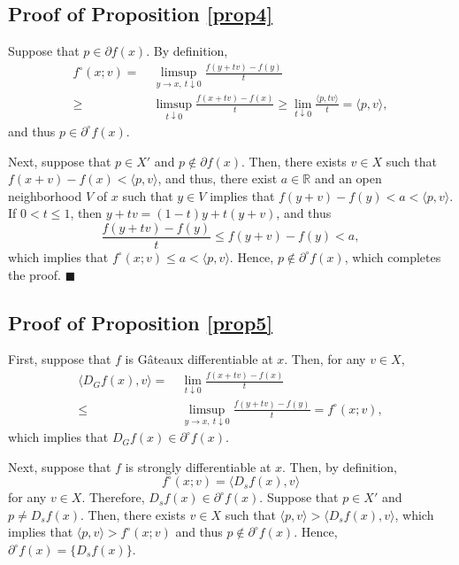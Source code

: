 \documentclass[a4paper,12pt]{article}
\theoremstyle{definition}
\begin{document}
\subsection{Proof of Proposition \ref{prop4}}
Suppose that $p\in \partial f(x)$. By definition,
\begin{align*}
f^{\circ}(x;v)=&~\limsup_{y\to x,\ t\downarrow 0}\frac{f(y+tv)-f(y)}{t}\\
\ge&~\limsup_{t\downarrow 0}\frac{f(x+tv)-f(x)}{t}\ge \lim_{t\downarrow 0}\frac{\langle p,tv\rangle}{t}=\langle p,v\rangle,
\end{align*}
and thus $p\in \partial^{\circ}f(x)$.

Next, suppose that $p\in X'$ and $p\notin \partial f(x)$. Then, there exists $v\in X$ such that $f(x+v)-f(x)<\langle p,v\rangle$, and thus, there exist $a\in \mathbb{R}$ and an open neighborhood $V$ of $x$ such that $y\in V$ implies that $f(y+v)-f(y)<a<\langle p,v\rangle$. If $0<t\le 1$, then $y+tv=(1-t)y+t(y+v)$, and thus
\[\frac{f(y+tv)-f(y)}{t}\le f(y+v)-f(y)<a,\]
which implies that $f^{\circ}(x;v)\le a<\langle p,v\rangle$. Hence, $p\notin \partial^{\circ}f(x)$, which completes the proof. $\blacksquare$




\subsection{Proof of Proposition \ref{prop5}}
First, suppose that $f$ is G\^ateaux differentiable at $x$. Then, for any $v\in X$,
\begin{align*}
\langle D_Gf(x),v\rangle=&~\lim_{t\downarrow 0}\frac{f(x+tv)-f(x)}{t}\\
\le&~\limsup_{y\to x,\ t\downarrow 0}\frac{f(y+tv)-f(y)}{t}=f^{\circ}(x;v),
\end{align*}
which implies that $D_Gf(x)\in \partial^{\circ}f(x)$.

Next, suppose that $f$ is strongly differentiable at $x$. Then, by definition,
\[f^{\circ}(x;v)=\langle D_sf(x),v\rangle\]
for any $v\in X$. Therefore, $D_sf(x)\in \partial^{\circ}f(x)$. Suppose that $p\in X'$ and $p\neq D_sf(x)$. Then, there exists $v\in X$ such that $\langle p,v\rangle>\langle D_sf(x),v\rangle$, which implies that $\langle p,v\rangle>f^{\circ}(x;v)$ and thus $p\notin \partial^{\circ}f(x)$. Hence, $\partial^{\circ}f(x)=\{D_sf(x)\}$.
\end{document}
